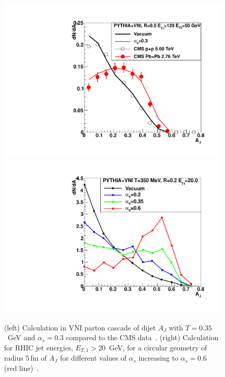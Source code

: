 \begin{figure}[ht]
 \begin{center}
    \includegraphics[trim = 2 2 2 2, clip, width=\twowidth]{figs/figure_physicscase_colemansmith_lhc_aj}
    \hfill
    \includegraphics[trim = 2 2 2 2, clip,width=\twowidth]{figs/figure_physicscase_colemansmith_rhic_aj_alphasensitivity}
    \caption[Dijet $A_J$ in VNI parton cascade compared to the CMS
    data and calculation for RHIC energies of $A_J$ for different
    values of $\alpha_s$]{\label{fig:colemansmith1}(left) Calculation
      in VNI parton cascade of dijet $A_J$ with $T=0.35$~GeV and
      $\alpha_s=0.3$ compared to the CMS
      data~\protect\cite{ColemanSmith:2011rw}{}.  (right) Calculation
      for RHIC jet energies, $E_{T,1}>20$~GeV, for a circular
      geometry of radius 5\,fm of $A_J$ for different values of
      $\alpha_s$ increasing to $\alpha_s=0.6$ (red
      line)~\protect\cite{ColemanSmith:2012vr}{}.}
 \end{center}
\end{figure}

